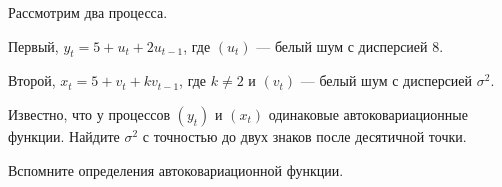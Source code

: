 
\begin{question}
Рассмотрим два процесса.

Первый, \(y_t = 5 + u_t + 2 u_{t-1}\), где \((u_t)\) --- белый шум с дисперсией \(8\).

Второй, \(x_t = 5 + v_t + k v_{t-1}\), где \(k\neq 2\) и \((v_t)\) --- белый шум с дисперсией \(\sigma^2\).

Известно, что у процессов \((y_t)\) и \((x_t)\) одинаковые автоковариационные функции.
Найдите \(\sigma^2\) с точностью до двух знаков после десятичной точки.
\end{question}

\begin{solution}
Вспомните определения автоковариационной функции.
\end{solution}

